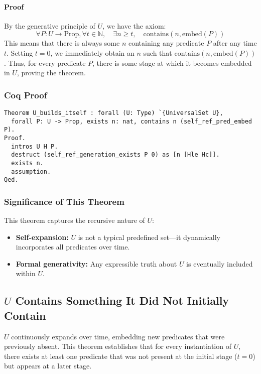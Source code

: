 \documentclass[12pt]{article}
\begin{document}
\paragraph{Proof}

By the generative principle of \( U \), we have the axiom:
\[
\forall P: U \to \text{Prop}, \forall t \in \mathbb{N}, \quad \exists n \geq t, \quad \text{contains}(n, \text{embed}(P))
\]
This means that there is always some $n$ containing any predicate $P$ after any time $t$. Setting \( t = 0 \), we immediately obtain an \( n \) such that \( \text{contains}(n, \text{embed}(P)) \). Thus, for every predicate \( P \), there is some stage at which it becomes embedded in \( U \), proving the theorem.

\subsubsection{Coq Proof}

\begin{lstlisting}[language=Coq]
Theorem U_builds_itself : forall (U: Type) `{UniversalSet U},
  forall P: U -> Prop, exists n: nat, contains n (self_ref_pred_embed P).
Proof.
  intros U H P.
  destruct (self_ref_generation_exists P 0) as [n [Hle Hc]].
  exists n.
  assumption.
Qed.
\end{lstlisting}

\subsubsection{Significance of This Theorem}

This theorem captures the recursive nature of \( U \):

\begin{itemize}
    \item \textbf{Self-expansion:} \( U \) is not a typical predefined set—it dynamically incorporates all predicates over time.
    \item \textbf{Formal generativity:} Any expressible truth about \( U \) is eventually included within \( U \).
\end{itemize}


\subsection{\( U \) Contains Something It Did Not Initially Contain}

$U$ continuously expands over time, embedding new predicates that were previously absent. This theorem establishes that for every instantiation of \( U \), there exists at least one predicate that was not present at the initial stage (\( t = 0 \)) but appears at a later stage.
\end{document}
